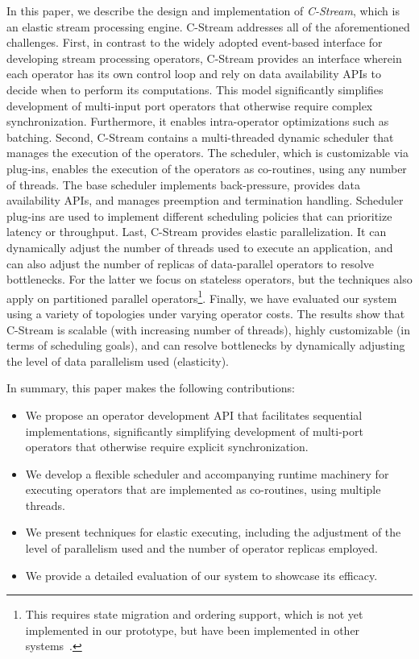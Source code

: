 In this paper, we describe the design and implementation of \emph{C-Stream},
which is an elastic stream processing engine. C-Stream addresses all of the
aforementioned challenges.  First, in contrast to the widely adopted
event-based interface for developing stream processing operators, C-Stream
provides an interface wherein each operator has its own control loop and rely
on data availability APIs to decide when to perform its computations. This
model significantly simplifies development of multi-input port operators that
otherwise require complex synchronization. Furthermore, it enables
intra-operator optimizations such as batching. Second, C-Stream contains a
multi-threaded dynamic scheduler that manages the execution of the operators.
The scheduler, which is customizable via plug-ins, enables the execution of
the operators as co-routines, using any number of threads. The base scheduler
implements back-pressure, provides data availability APIs, and manages
preemption and termination handling. Scheduler plug-ins are used to implement
different scheduling policies that can prioritize latency or throughput. Last,
C-Stream provides elastic parallelization. It can dynamically adjust the
number of threads used to execute an application, and can also adjust the
number of replicas of data-parallel operators to resolve bottlenecks. For the
latter we focus on stateless operators, but the techniques also apply on
partitioned parallel operators\footnote{This requires state migration and
ordering support, which is not yet implemented in our prototype, but have been
implemented in other systems~\cite{ref:stream-parallel}.}. Finally, we have
evaluated our system using a variety of topologies under varying operator
costs. The results show that C-Stream is scalable (with increasing number of
threads), highly customizable (in terms of scheduling goals), and can resolve
bottlenecks by dynamically adjusting the level of data parallelism used
(elasticity).
 
In summary, this paper makes the following contributions:
\begin{itemize}
\item We propose an operator development API that facilitates sequential
implementations, significantly simplifying development of multi-port
operators that otherwise require explicit synchronization.
\item We develop a flexible scheduler and accompanying runtime machinery for
executing operators that are implemented as co-routines, using multiple threads. 
\item We present techniques for elastic executing, including the adjustment of the
level of parallelism used and the number of operator replicas employed.
\item We provide a detailed evaluation of our system to showcase its efficacy.
\end{itemize}

